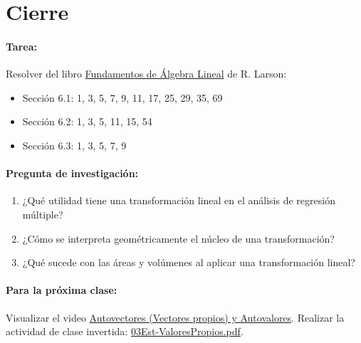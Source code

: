 \documentclass[a4,11pt]{aleph-notas}
\begin{document}
\section*{Cierre}

\paragraph{Tarea:}  
Resolver del libro \href{https://catalogobiblioteca.puce.edu.ec/cgi-bin/koha/opac-detail.pl?biblionumber=86081&query_desc=kw%2Cwrdl%3A%20algebra%20larson}{Fundamentos de Álgebra Lineal} de R. Larson:
\begin{itemize}
    \item Sección 6.1: 1, 3, 5, 7, 9, 11, 17, 25, 29, 35, 69
    \item Sección 6.2: 1, 3, 5, 11, 15, 54
    \item Sección 6.3: 1, 3, 5, 7, 9
\end{itemize}


\paragraph{Pregunta de investigación:}
\begin{enumerate}[leftmargin=*]
    \item ¿Qué utilidad tiene una transformación lineal en el análisis de regresión múltiple?
    \item ¿Cómo se interpreta geométricamente el núcleo de una transformación?
    \item ¿Qué sucede con las áreas y volúmenes al aplicar una transformación lineal?
\end{enumerate}

\paragraph{Para la próxima clase:}  
Visualizar el video \href{https://youtu.be/PFDu9oVAE-g?si=wuTb6PTOu0xJCW-F}{Autovectores (Vectores propios) y Autovalores}. Realizar la actividad de clase invertida: \href{https://fcena-puce.github.io/AlgLinealyGeomAnalitica-05-N0068/2-ClaseInvertida/03Est-ValoresPropios.pdf}{03Est-ValoresPropios.pdf}.
\end{document}

